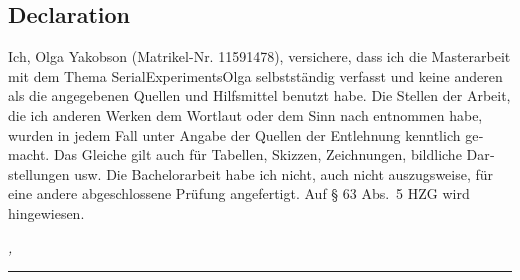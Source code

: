 %
\begin{otherlanguage}{ngerman}
	\chapter*{Declaration}
	\label{sec:declaration}
	\thispagestyle{empty}

	Ich, Olga Yakobson (Matrikel-Nr. 11591478), versichere, dass ich die Masterarbeit mit
	dem Thema SerialExperimentsOlga selbstständig verfasst und keine
	anderen als die angegebenen Quellen und Hilfsmittel benutzt habe. Die Stellen der
	Arbeit, die ich anderen Werken dem Wortlaut oder dem Sinn nach entnommen habe,
	wurden in jedem Fall unter Angabe der Quellen der Entlehnung kenntlich gemacht.
	Das Gleiche gilt auch für Tabellen, Skizzen, Zeichnungen, bildliche Darstellungen
	usw. Die Bachelorarbeit habe ich nicht, auch nicht auszugsweise, für eine andere
	abgeschlossene Prüfung angefertigt. Auf § 63 Abs.\ 5 HZG wird hingewiesen.
	\bigskip

	\noindent\textit{\thesisUniversityCity, \thesisDate}

	\smallskip

	\begin{flushright}
		\begin{minipage}{5cm}
			\rule{\textwidth}{1pt}
			\centering\thesisName
		\end{minipage}
	\end{flushright}
\end{otherlanguage}
